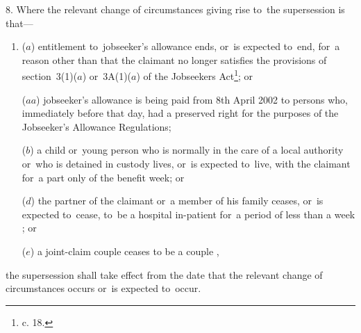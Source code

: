 \documentclass[12pt,a4paper]{article}
\begin{document}
\medskip

8.  Where the relevant change of circumstances giving rise to~the supersession is that—
\begin{enumerate}\item[]
($a$) entitlement to~jobseeker’s allowance ends, or~is expected to~end, for~a reason other than that the claimant no longer satisfies the provisions of section~3(1)($a$)  
or~3A(1)($a$)   %
of the Jobseekers Act\footnote{ c. 18.}; or

($aa$) jobseeker’s allowance is being paid from 8th April 2002 to persons who, immediately before that day, had a preserved right for the purposes of the Jobseeker’s Allowance Regulations;

($b$) a child or~young person who is normally in the care of a local authority or~who is detained in custody lives, or~is expected to~live, with the claimant for~a part only of the benefit week; or


($d$) the partner of the claimant or~a member of his family ceases, or~is expected to~cease, to~be a hospital in-patient for~a period of less than a week%
; or

    ($e$) 
    a joint-claim couple ceases to be 
a couple%
,
\end{enumerate}
the supersession shall take effect from the date that the relevant change of circumstances occurs or~is expected to~occur.

\end{document}
